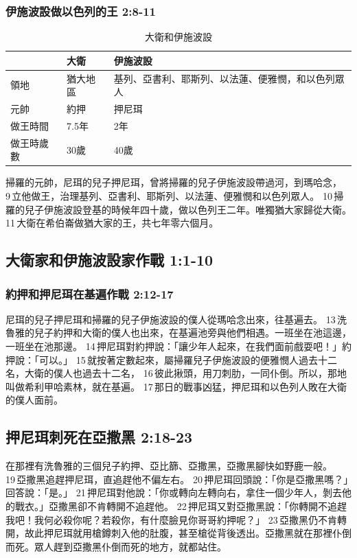 \subsubsection{伊施波設做以色列的王 2:8-11}
\begin{table}[H]
\centering 
\begin{tabular}{|p{2cm}|p{1.5cm}|p{9cm}|}
\hline
\hline
 & 大衛& 伊施波設\\\hline
領地 &猶大地區&基列、亞書利、耶斯列、以法蓮、便雅憫，和以色列眾人\\\hline
元帥&約押&押尼珥\\\hline
做王時間& 7.5年&2年\\\hline
做王時歲數& 30歲 & 40歲\\\hline
\end{tabular}
\caption{大衛和伊施波設}
\end{table}
掃羅的元帥，尼珥的兒子押尼珥，曾將掃羅的兒子伊施波設帶過河，到瑪哈念， 9 立他做王，治理基列、亞書利、耶斯列、以法蓮、便雅憫和以色列眾人。 10 掃羅的兒子伊施波設登基的時候年四十歲，做以色列王二年。唯獨猶大家歸從大衛。 11 大衛在希伯崙做猶大家的王，共七年零六個月。

\subsection{大衛家和伊施波設家作戰 1:1-10}
\subsubsection{約押和押尼珥在基遍作戰 2:12-17}
尼珥的兒子押尼珥和掃羅的兒子伊施波設的僕人從瑪哈念出來，往基遍去。 13 洗魯雅的兒子約押和大衛的僕人也出來，在基遍池旁與他們相遇。一班坐在池這邊，一班坐在池那邊。 14 押尼珥對約押說：「讓少年人起來，在我們面前戲耍吧！」約押說：「可以。」 15 就按著定數起來，屬掃羅兒子伊施波設的便雅憫人過去十二名，大衛的僕人也過去十二名， 16 彼此揪頭，用刀刺肋，一同仆倒。所以，那地叫做希利甲哈素林，就在基遍。 17 那日的戰事凶猛，押尼珥和以色列人敗在大衛的僕人面前。

\subsection{押尼珥刺死在亞撒黑 2:18-23}
在那裡有洗魯雅的三個兒子約押、亞比篩、亞撒黑，亞撒黑腳快如野鹿一般。 19 亞撒黑追趕押尼珥，直追趕他不偏左右。 20 押尼珥回頭說：「你是亞撒黑嗎？」回答說：「是。」 21 押尼珥對他說：「你或轉向左轉向右，拿住一個少年人，剝去他的戰衣。」亞撒黑卻不肯轉開不追趕他。 22 押尼珥又對亞撒黑說：「你轉開不追趕我吧！我何必殺你呢？若殺你，有什麼臉見你哥哥約押呢？」 23 亞撒黑仍不肯轉開，故此押尼珥就用槍鐏刺入他的肚腹，甚至槍從背後透出。亞撒黑就在那裡仆倒而死。眾人趕到亞撒黑仆倒而死的地方，就都站住。

